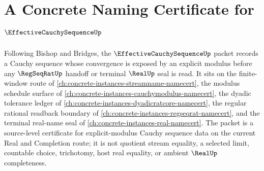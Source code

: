 \chapter{A Concrete Naming Certificate for $\EffectiveCauchySequenceUp$}
\label{ch:concrete-instances-effective-cauchy-sequence-namecert}

Following Bishop and Bridges, the $\EffectiveCauchySequenceUp$ packet records a Cauchy sequence whose convergence is exposed by an explicit modulus before any $\RegSeqRatUp$ handoff or terminal $\RealUp$ seal is read. It sits on the finite-window route of \autoref{ch:concrete-instances-streamname-namecert}, the modulus schedule surface of \autoref{ch:concrete-instances-cauchymodulus-namecert}, the dyadic tolerance ledger of \autoref{ch:concrete-instances-dyadicratcore-namecert}, the regular rational readback boundary of \autoref{ch:concrete-instances-regseqrat-namecert}, and the terminal real-name seal of \autoref{ch:concrete-instances-real-namecert}. The packet is a source-level certificate for explicit-modulus Cauchy sequence data on the current Real and Completion route; it is not quotient stream equality, a selected limit, countable choice, trichotomy, host real equality, or ambient $\RealUp$ completeness.

